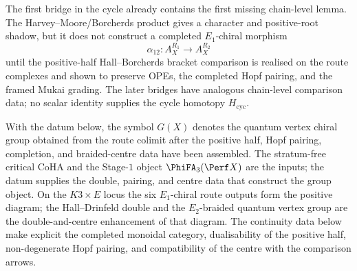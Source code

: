 \begin{remark}
\label{rem:cy-c-first-missing-lemma}
The first bridge in the cycle already contains the first missing
chain-level lemma. The Harvey--Moore/Borcherds product gives a
character and positive-root shadow, but it does not construct a
completed \(E_1\)-chiral morphism
\[
 \alpha_{12}\colon A_X^{R_1}\to A_X^{R_2}
\]
until the positive-half Hall--Borcherds bracket comparison is realised
on the route complexes and shown to preserve OPEs, the completed Hopf
pairing, and the framed Mukai grading. The later bridges have analogous
chain-level comparison data; no scalar identity supplies the cycle homotopy
\(H_{\mathrm{cyc}}\).
\end{remark}

\begin{remark}
\label{rem:cy-c-global-gx-scope}
With the datum below, the symbol $G(X)$ denotes the quantum
vertex chiral group obtained from the route colimit after the positive
half, Hopf pairing, completion, and braided-centre data have been
assembled. The stratum-free critical CoHA and the Stage-$1$ object
$\PhiFA_3(\Perf X)$ are the inputs; the datum supplies the double,
pairing, and centre data that construct the group object. On the
$K3\times E$ locus the six $E_1$-chiral route outputs form the positive
diagram; the Hall--Drinfeld double and the $E_2$-braided quantum vertex
group are the double-and-centre enhancement of that diagram. The
continuity data below make explicit the completed monoidal category,
dualisability of the positive half, non-degenerate Hopf pairing, and
compatibility of the centre with the comparison arrows.
\end{remark}

